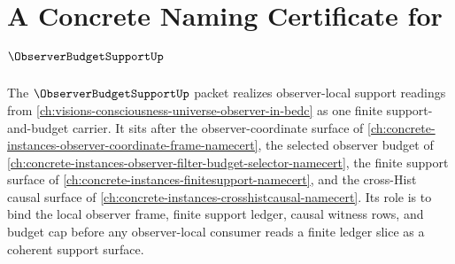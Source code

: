 \chapter{A Concrete Naming Certificate for $\ObserverBudgetSupportUp$}
\label{ch:concrete-instances-observer-budget-support-namecert}

The $\ObserverBudgetSupportUp$ packet realizes observer-local support readings from \autoref{ch:visions-consciousness-universe-observer-in-bedc} as one finite support-and-budget carrier. It sits after the observer-coordinate surface of \autoref{ch:concrete-instances-observer-coordinate-frame-namecert}, the selected observer budget of \autoref{ch:concrete-instances-observer-filter-budget-selector-namecert}, the finite support surface of \autoref{ch:concrete-instances-finitesupport-namecert}, and the cross-Hist causal surface of \autoref{ch:concrete-instances-crosshistcausal-namecert}. Its role is to bind the local observer frame, finite support ledger, causal witness rows, and budget cap before any observer-local consumer reads a finite ledger slice as a coherent support surface.

